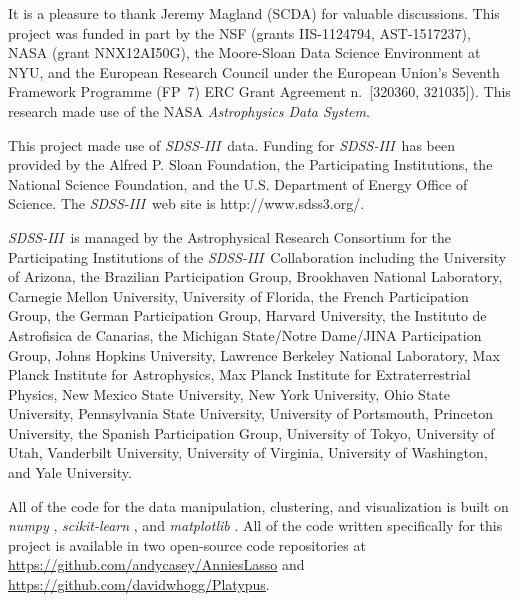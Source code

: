 \documentclass[12pt, letterpaper, preprint]{aastex}
\newcommand{\acronym}[1]{{\small{#1}}}
\newcommand{\project}[1]{\textsl{#1}}
\newcommand{\sdssiii}{\project{\acronym{SDSS-III}}}
\begin{document}
\acknowledgements
It is a pleasure to thank
  Jeremy Magland (\acronym{SCDA})
for valuable discussions.
This project was funded in part by
  the \acronym{NSF} (grants \acronym{IIS-1124794}, \acronym{AST-1517237}),
  \acronym{NASA} (grant \acronym{NNX12AI50G}),
  the Moore-Sloan Data Science Environment at \acronym{NYU}, and
  the European Research Council under the
  European Union's Seventh Framework Programme (FP~7)
  \acronym{ERC} Grant Agreement n.~\acronym{[320360, 321035]}).
This research made use of the \acronym{NASA} \project{Astrophysics Data System}.

This project made use of \sdssiii\ data.
Funding for \sdssiii\ has been provided by the Alfred P. Sloan
Foundation, the Participating Institutions, the National Science
Foundation, and the \acronym{U.S.} Department of Energy Office of Science. The
\sdssiii\ web site is http://www.sdss3.org/.

\sdssiii\ is managed by the Astrophysical Research Consortium for the
Participating Institutions of the \sdssiii\ Collaboration including the
University of Arizona, the Brazilian Participation Group, Brookhaven
National Laboratory, Carnegie Mellon University, University of
Florida, the French Participation Group, the German Participation
Group, Harvard University, the Instituto de Astrofisica de Canarias,
the Michigan State/Notre Dame/\acronym{JINA} Participation Group, Johns Hopkins
University, Lawrence Berkeley National Laboratory, Max Planck
Institute for Astrophysics, Max Planck Institute for Extraterrestrial
Physics, New Mexico State University, New York University, Ohio State
University, Pennsylvania State University, University of Portsmouth,
Princeton University, the Spanish Participation Group, University of
Tokyo, University of Utah, Vanderbilt University, University of
Virginia, University of Washington, and Yale University.

All of the code for the data manipulation, clustering, and
visualization is built on \project{numpy} \citep{numpy},
\project{scikit-learn} \citep{sklearn}, and \project{matplotlib}
\citep{matplotlib}.
All of the code written specifically for this project is available in
two open-source code repositories at
\url{https://github.com/andycasey/AnniesLasso} and
\url{https://github.com/davidwhogg/Platypus}.
\end{document}
